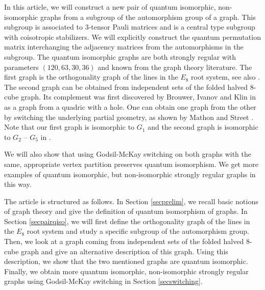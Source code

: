In this article, we will construct a new pair of quantum isomorphic, non-isomorphic graphs from a subgroup of the automorphism group of a graph. This subgroup is associated to $3$-tensor Pauli matrices and is a central type subgroup with coisotropic stabilizers. We will explicitly construct the quantum permutation matrix interchanging the adjacency matrices from the automorphisms in the subgroup. The quantum isomorphic graphs are both strongly regular with parameters $(120, 63, 30, 36)$ and known from the graph theory literature. The first graph is the orthogonality graph of the lines in the $E_8$ root system, see also \cite[Section 10.39]{BVM}. The second graph can be obtained from independent sets of the folded halved $8$-cube graph. Its complement was first discovered by Brouwer, Ivanov and Klin in \cite{BIK} as a graph from a quadric with a hole. 
One can obtain one graph from the other by switching the underlying partial geometry, as shown by Mathon and Street \cite{MS}. Note that our first graph is isomorphic to $G_1$ and the second graph is isomorphic to $G_2$ -- $G_5$ in \cite[Table 2.2]{MS}. 

We will also show that using Godsil-McKay switching on both graphs with the same, appropriate vertex partition preserves quantum isomorphism. We get more examples of quantum isomorphic, but non-isomorphic strongly regular graphs in this way. 

The article is structured as follows. In Section \ref{secprelim}, we recall basic notions of graph theory and give the definition of quantum isomorphism of graphs. In Section \ref{secpairqiso}, we will first define the orthogonality graph of the lines in the $E_8$ root system and study a specific subgroup of the automorphism group. Then, we look at a graph coming from independent sets of the folded halved $8$-cube graph and give an alternative description of this graph. Using this description, we show that the two mentioned graphs are quantum isomorphic. Finally, we obtain more quantum isomorphic, non-isomorphic strongly regular graphs using Godsil-McKay switching in Section \ref{secswitching}. 


